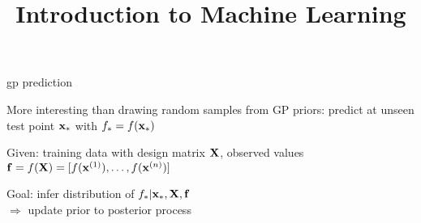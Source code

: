 \documentclass[11pt,compress,t,notes=noshow, xcolor=table]{beamer}
\title{Introduction to Machine Learning}
\begin{document}
\newcommand{\nmk}{\normal(\zero, \Kmat)} %
\newcommand{\nzk}{\normal(\zero, \Kmat)}
\newcommand{\xxtnorm}{\| \xv - \xtil \|}
\newcommand{\kcc}{k(\cdot, \cdot)} 
\newcommand{\kxxt}{k(\xv, \xtil)} %
\newcommand{\Xsubset}{\bm{X}}
\newcommand{\fX}{f(\Xsubset)}
\newcommand{\kXX}{k(\Xsubset, \Xsubset)}
\newcommand{\mX}{m(\Xsubset)}
\newcommand{\gpmk}{\mathcal{GP}(m(\cdot), k(\cdot, \cdot))}
\newcommand{\gpzk}{\mathcal{GP}(\zero, k(\cdot, \cdot))}
\newcommand{\Kmatinv}{\Kmat^{-1}}
\newcommand{\xstar}{\xv_\ast}
\newcommand{\ystar}{\yv_\ast}
\newcommand{\fstar}{\fv_\ast}
\newcommand{\Xstar}{\Xmat_\ast}
\newcommand{\Ky}{\Kmat_y}


\begin{framei}[sep=L]{gp prediction}
\item More interesting than drawing random samples from GP priors: predict at unseen test point $\xstar$ with $f_\ast = f(\xstar)$
\item Given: training data with design matrix $\mathbf{X}$, observed values $\mathbf{f} = f(\mathbf{X}) = [f(\mathbf{x}^{(1)}), \dots, f(\mathbf{x}^{(n)})]$
\item Goal: infer distribution of $f_\ast | \xstar, \Xmat, \fv$ \\$\Rightarrow$ update prior to posterior process
\end{framei}
\end{document}
